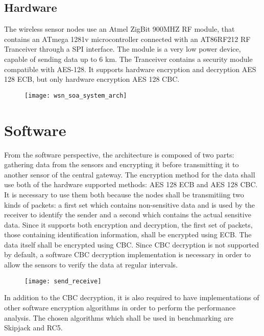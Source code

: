 \label{chap:arch}
\subsection{Hardware}

The wireless sensor nodes use an Atmel ZigBit 900MHZ RF module, that contains an ATmega 1281v microcontroller connected with an AT86RF212 RF Tranceiver through a SPI interface. The module is a very low power device, capable of sending data up to 6 km. The Tranceiver contains a security module compatible with AES-128. It supports hardware encryption and decryption AES 128 ECB, but only hardware encryption AES 128 CBC.

\begin{figure}
  \texttt{[image: wsn\_soa\_system\_arch]}
\end{figure}

\section{Software}

From the software perspective, the architecture is composed of two parts: gathering data from the sensors and encrypting it before transmitting it to another sensor of the central gateway.
The encryption method for the data shall use both of the hardware supported methods: AES 128 ECB and AES 128 CBC. It is necessary to use them both because the nodes shall be transmitiing 
two kinds of packets: a first set which contains non-sensitive data and is used by the receiver to identify the sender and a second which contains the actual sensitive data. Since it supports 
both encryption and decryption, the first set of packets, those containing identification information, shall be encrypted using ECB. The data itself shall be encrypted using CBC. Since CBC 
decryption is not supported by default, a software CBC decryption implementation is necessary in order to allow the sensors to verify the data at regular intervals.

\begin{figure}
  \texttt{[image: send\_receive]}
\end{figure}

In addition to the CBC decryption, it is also required to have implementations of other software encryption algorithms in order to perform the performance analysis. The chosen 
algorithms which shall be used in benchmarking are Skipjack and RC5.
